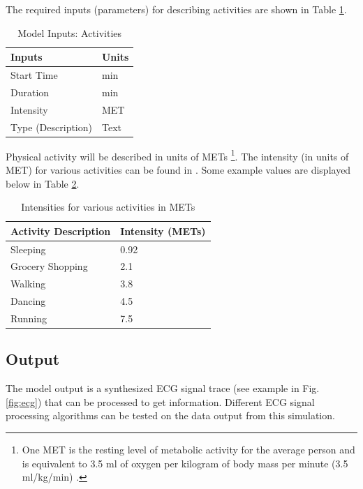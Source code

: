 \documentclass[paper=a4, fontsize=11pt]{scrartcl}
\numberwithin{equation}{section}		%
\numberwithin{figure}{section}			%
\numberwithin{table}{section}		    %
\begin{document}
The required inputs (parameters) for describing activities are shown in 
Table \ref{tbl:activities}.

\begin{table}[h]
	\centering
	\caption{Model Inputs: Activities}
	\label{tbl:activities}
	\begin{tabular}{|l|l|}
		\hline
		\textbf{Inputs}    & \textbf{Units} \\ \hline
		Start Time         & min            \\ \hline
		Duration           & min            \\ \hline
		Intensity          & MET            \\ \hline
		Type (Description) & Text           \\ \hline
	\end{tabular}
\end{table}

Physical activity will be described in units of METs \footnote{One MET is the resting level of 
metabolic activity for the average person and is equivalent to 3.5 ml of oxygen per kilogram of 
body mass per minute (3.5 ml/kg/min) \cite{hotehama2003simulation}.}. The intensity (in units
of MET) for various activities can be found in \cite{ainsworth2000compendium}. Some example 
values are displayed below in Table \ref{tbl:mets}.

\begin{table}[H]
	\centering
	\caption{Intensities for various activities in METs \cite{ainsworth2000compendium}}
	\label{tbl:mets}
	\begin{tabular}{|l|l|}
		\hline
		\textbf{Activity Description} & \textbf{Intensity (METs)} \\ \hline
		Sleeping                      & 0.92                      \\ \hline
		Grocery Shopping              & 2.1                       \\ \hline
		Walking                       & 3.8                       \\ \hline
		Dancing                       & 4.5                       \\ \hline
		Running                       & 7.5                       \\ \hline
	\end{tabular}
\end{table}

\subsection{Output} \label{sec:model_out}
The model output is a synthesized ECG signal trace (see example in Fig. \ref{fig:ecg}) that 
can be processed to get information. Different ECG signal processing algorithms can be tested
on the data output from this simulation.
\end{document}
